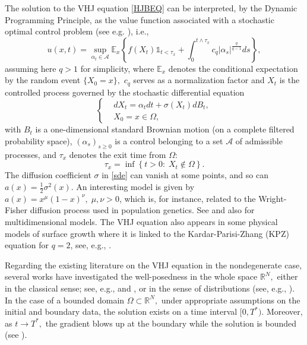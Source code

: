 \documentclass[reqno]{amsart}
\theoremstyle{plain}
\theoremstyle{remark}
\numberwithin{equation}{section}
\begin{document}
The solution to the VHJ equation \eqref{HJBEQ} can be interpreted, by the Dynamic Programming Principle, as the value function associated with a stochastic optimal control problem (see e.g. \cite{Barles04, zua11}), i.e.,
$$u(x,t)=\sup_{\alpha_t \in \mathcal{A}}\mathbb{E}_x\left\lbrace f(X_t)\mathds{1}_{t<\tau_x}+\int_0^{t \wedge\tau_x}c_q\vert \alpha_s\vert^{\frac{q}{q-1}}ds\right\rbrace,$$
assuming here $q>1$ for simplicity, where $\mathbb{E}_x$ denotes the conditional expectation by the random event $\{X_0=x\},$ $c_q$ serves as a normalization factor and $X_t$ is the controlled process governed by the stochastic differential equation
\begin{equation}
\left\{
\begin{aligned}
& dX_{t}=\alpha_tdt+  \sigma(X_t)dB_t,\\
&X_0=x\in \Omega,
\end{aligned}\label{sde}
\right.
\end{equation}
with $B_t$ is a one-dimensional standard Brownian motion (on a complete filtered probability space), $(\alpha_s)_{s\geqslant 0}$ is a control belonging to a set $\mathcal{A}$ of admissible processes, and $\tau_x$ denotes the exit time from $\Omega$:
$$\tau_x=\inf\left\lbrace t>0\colon \; X_t\notin \Omega\right\rbrace.$$ The diffusion coefficient $\sigma$ in \eqref{sde} can vanish at some points, and so can $ a(x)= \frac{1}{2}\sigma^2(x)$. An interesting model is given by $a(x)=x^\mu (1-x)^\nu, \; \mu,\nu >0$, which is, for instance, related to the Wright-Fisher diffusion process used in population genetics. See \cite[Examples, p.~48]{Ma68} and also \cite[Ch.~VIII, \S 8]{Sh92} for multidimensional models. The VHJ equation also appears in some physical models of surface growth where it is linked to the Kardar-Parisi-Zhang (KPZ) equation for $q=2$, see, e.g., \cite{Kardar1986}.

Regarding the existing literature on the VHJ equation in the nondegenerate case, several works have investigated the well-posedness in the whole space $\mathbb{R}^N,$ either in the classical sense; see, e.g., \cite{AmourBenArtzi1998,BenArtzi1992} and \cite{BenArtzi2002}, or in the sense of distributions (see, e.g., \cite{BenArtziSoupletWeissler2002}). In the case of a bounded domain $\Omega\subset \mathbb{R}^N,$ under appropriate assumptions on the initial and boundary data, the solution exists on a time interval $[0,T^*)$. Moreover, as $t\to T^*,$ the gradient blows up at the boundary while the solution is bounded (see \cite{FilaLieberman1994, Souplet2002}).
\end{document}
